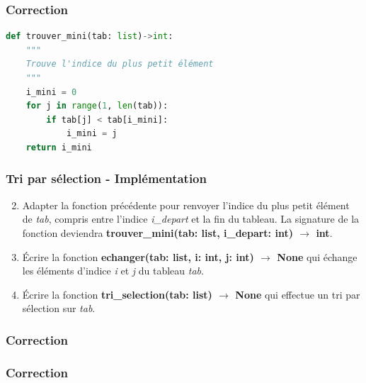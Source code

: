\documentclass[svgnames,11pt]{beamer}
\begin{document}
\begin{frame}[fragile]
    \frametitle{Correction}

    \begin{center}
    \begin{lstlisting}[language=Python, basicstyle=\small]
def trouver_mini(tab: list)->int:
    """
    Trouve l'indice du plus petit élément
    """
    i_mini = 0
    for j in range(1, len(tab)):
        if tab[j] < tab[i_mini]:
            i_mini = j
    return i_mini
\end{lstlisting}
    \end{center}

\end{frame}
\begin{frame}
    \frametitle{Tri par sélection - Implémentation}
    \setcounter{compteuractivite}{1}
    \begin{activite}        
        \begin{enumerate}
            \setcounter{enumi}{1}
            \item Adapter la fonction précédente pour renvoyer l'indice du plus petit élément de \emph{tab}, compris entre l'indice \emph{i\_depart} et la fin du tableau. La signature de la fonction deviendra \textbf{trouver\_mini(tab: list, i\_depart: int) $\rightarrow$ int}.
            \item Écrire la fonction \textbf{echanger(tab: list, i: int, j: int) $\rightarrow$ None} qui échange les éléments d'indice \emph{i} et \emph{j} du tableau \emph{tab}.
            \item Écrire la fonction \textbf{tri\_selection(tab: list) $\rightarrow$ None} qui effectue un tri par sélection sur \emph{tab}.
        \end{enumerate}
    \end{activite}

\end{frame}

\begin{frame}
    \frametitle{Correction}

    

\end{frame}

\begin{frame}
    \frametitle{Correction}

    

\end{frame}
\end{document}
